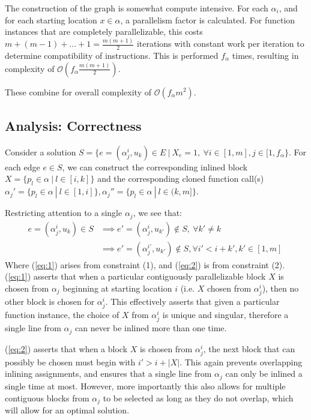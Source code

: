 \documentclass[12pt,twoside]{article}
\begin{document}
The construction of the graph is somewhat compute intensive. For each $\alpha_i$, and for each starting location $x \in \alpha$, a parallelism factor is calculated. For function instances that are completely parallelizable, this costs $m + (m-1) + ... + 1 = \frac{m(m+1)}{2}$ iterations with constant work per iteration to determine compatibility of instructions. This is performed $f_{\alpha}$ times, resulting in complexity of $\mathcal{O}(f_{\alpha}\frac{m(m+1)}{2})$. 

These combine for overall complexity of $\mathcal{O}(f_{\alpha}m^2)$.

\subsection{Analysis: Correctness}
Consider a solution $S = \{e = (\alpha_j^i,u_k) \in E\ |\ X_e = 1,\ \forall i \in [1,m], j \in [1,f_{\alpha}\}$. For each edge $e \in S$, we can construct the corresponding inlined block $X = \{p_l \in \alpha\ |\ l \in [i,k]\}$ and the corresponding cloned function call(s) $\alpha_j' = \{p_l \in \alpha\ |\ l \in [1,i]\}, \alpha_j'' = \{p_l \in \alpha\ |\ l \in (k,m]\}$.

Restricting attention to a single $\alpha_j$, we see that:
	\begin{align}
		e = (\alpha_j^i, u_k) \in S& \implies e' = (\alpha_j^i, u_{k'}) \notin S,\ \forall k' \neq k \label{eq:1}\\ 
		& \implies e' = (\alpha_j^{i'}, u_{k'}) \notin S, \forall i' < i + k',k'\in [1,m]\  \label{eq:2}
	\end{align}
	Where (\ref{eq:1}) arises from constraint (1), and (\ref{eq:2}) is from constraint (2). (\ref{eq:1}) asserts that when a particular contiguously parallelizable block $X$ is chosen from $\alpha_j$ beginning at starting location $i$ (i.e. $X$ chosen from $\alpha_j^i$), then no other block is chosen for $\alpha_j^i$. This effectively asserts that given a particular function instance, the choice of $X$ from $\alpha_j^i$ is unique and singular, therefore a single line from $\alpha_j$ can never be inlined more than one time.   
	
	(\ref{eq:2}) asserts that when a block $X$ is chosen from $\alpha_j^i$, the next block that can possibly be chosen must begin with $i' > i + |X|$. This again prevents overlapping inlining assignments, and ensures that a single line from $\alpha_j$ can only be inlined a single time at most. However, more importantly this also allows for multiple contiguous blocks from $\alpha_j$ to be selected as long as they do not overlap, which will allow for an optimal solution. 
\end{document}
